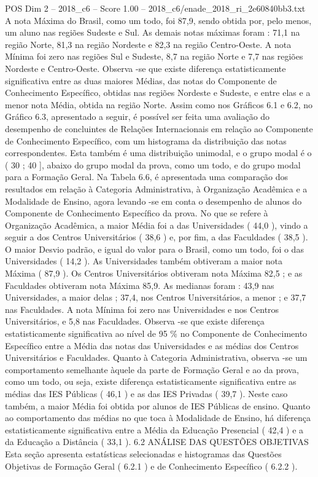 \begin{textsample}{POS Dim 2 – 2018\_c6 – Score 1.00 – 2018\_c6/enade\_2018\_ri\_2e60840bb3.txt}
A nota Máxima do Brasil, como um todo, foi 87,9, sendo obtida por, pelo menos, um aluno nas regiões Sudeste e Sul.
As demais notas máximas foram : 71,1 na região Norte, 81,3 na região Nordeste e 82,3 na região Centro-Oeste.
A nota Mínima foi zero nas regiões Sul e Sudeste, 8,7 na região Norte e 7,7 nas regiões Nordeste e Centro-Oeste.
Observa -se que existe diferença estatisticamente significativa entre as duas maiores Médias, das notas do Componente de Conhecimento Específico, obtidas nas regiões Nordeste e Sudeste, e entre elas e a menor nota Média, obtida na região Norte.
Assim como nos Gráficos 6.1 e 6.2, no Gráfico 6.3, apresentado a seguir, é possível ser feita uma avaliação do desempenho de concluintes de Relações Internacionais em relação ao Componente de Conhecimento Específico, com um histograma da distribuição das notas correspondentes.
Esta também é uma distribuição unimodal, e o grupo modal é o ( 30 ; 40 ], abaixo do grupo modal da prova, como um todo, e do grupo modal para a Formação Geral.
Na Tabela 6.6, é apresentada uma comparação dos resultados em relação à Categoria Administrativa, à Organização Acadêmica e a Modalidade de Ensino, agora levando -se em conta o desempenho de alunos do Componente de Conhecimento Específico da prova.
No que se refere à Organização Acadêmica, a maior Média foi a das Universidades ( 44,0 ), vindo a seguir a dos Centros Universitários ( 38,6 ) e, por fim, a das Faculdades ( 38,5 ).
O maior Desvio padrão, e igual do valor para o Brasil, como um todo, foi o das Universidades ( 14,2 ).
As Universidades também obtiveram a maior nota Máxima ( 87,9 ).
Os Centros Universitários obtiveram nota Máxima 82,5 ; e as Faculdades obtiveram nota Máxima 85,9.
As medianas foram : 43,9 nas Universidades, a maior delas ; 37,4, nos Centros Universitários, a menor ; e 37,7 nas Faculdades.
A nota Mínima foi zero nas Universidades e nos Centros Universitários, e 5,8 nas Faculdades.
Observa -se que existe diferença estatisticamente significativa ao nível de 95 \% no Componente de Conhecimento Específico entre a Média das notas das Universidades e as médias dos Centros Universitários e Faculdades.
Quanto à Categoria Administrativa, observa -se um comportamento semelhante àquele da parte de Formação Geral e ao da prova, como um todo, ou seja, existe diferença estatisticamente significativa entre as médias das IES Públicas ( 46,1 ) e as das IES Privadas ( 39,7 ).
Neste caso também, a maior Média foi obtida por alunos de IES Públicas de ensino.
Quanto ao comportamento das médias no que toca à Modalidade de Ensino, há diferença estatisticamente significativa entre a Média da Educação Presencial ( 42,4 ) e a da Educação a Distância ( 33,1 ). 6.2 ANÁLISE DAS QUESTÕES OBJETIVAS Esta seção apresenta estatísticas selecionadas e histogramas das Questões Objetivas de Formação Geral ( 6.2.1 ) e de Conhecimento Específico ( 6.2.2 ).

\end{textsample}

